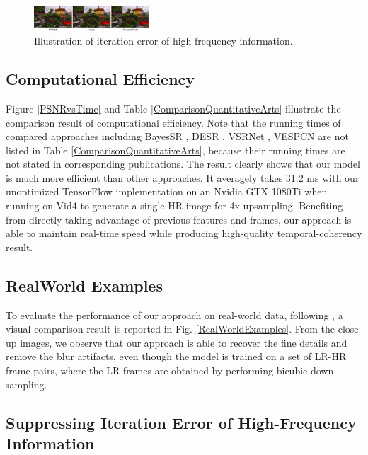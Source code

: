 \documentclass[letterpaper]{article} %
\begin{document}
\begin{figure}[t]
\centering
\includegraphics[width=4.284000000000001 cm,height=0.37in ]{Fig10.png}
\caption{Illustration of iteration error of high-frequency information.}
\label{SuppressingFigure}
\end{figure}



\subsection{Computational Efficiency}


Figure \ref{PSNRvsTime} and Table \ref{ComparisonQuantitativeArts} illustrate the comparison result of computational efficiency. Note that the running times of compared approaches including BayesSR \cite{BayesSR2011cvpr}, DESR \cite{DESR2015iccv}, VSRNet \cite{VSRNet2016TCT}, VESPCN \cite{VESPCN2017cvpr} are not listed in Table \ref{ComparisonQuantitativeArts}, because their running times are not stated in corresponding publications. The result clearly shows that our model is much more efficient than other approaches. It averagely takes 31.2 ms with our unoptimized TensorFlow implementation on an Nvidia GTX 1080Ti when running on Vid4 to generate a single HR image for 4x upsampling. Benefiting from directly taking advantage of previous features and frames, our approach is able to maintain real-time speed while producing high-quality temporal-coherency result.


\vspace{-1.46mm}
\subsection{RealWorld Examples}


To evaluate the performance of our approach on real-world data, following \cite{VESPCN2017cvpr}, a visual comparison result is reported in Fig. \ref{RealWorldExamples}. From the close-up images, we observe that our approach is able to recover the fine details and remove the blur artifacts, even though the model is trained on a set of LR-HR frame pairs, where the LR frames are obtained by performing bicubic down-sampling.



\vspace{-0.72mm}
\subsection{Suppressing Iteration Error of High-Frequency Information}
\end{document}
